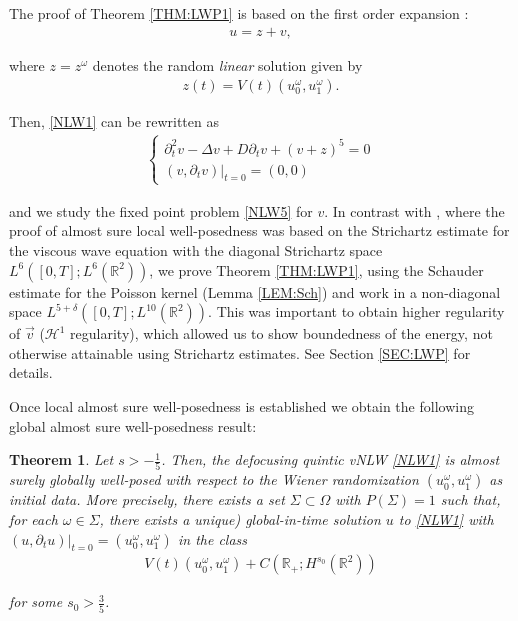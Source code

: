 \documentclass[letterpaper, 11pt,  reqno]{amsart}
\newtheorem{theorem}{Theorem} [section]
\newcommand{\1}{\hspace{0.5mm}\text{I}\hspace{0.2mm}}
\newcommand{\noi}{\noindent}
\newcommand{\R}{\mathbb{R}}
\newcommand{\dl}{\delta}
\newcommand{\Dl}{\Delta}
\newcommand{\dt}{\partial_t}
\renewcommand{\o}{\omega}
\renewcommand{\O}{\Omega}
\renewcommand{\H}{\mathcal{H}}
\numberwithin{equation}{section}
\numberwithin{theorem}{section}
\begin{document}
The proof of 
Theorem \ref{THM:LWP1} is based on 
 the first order expansion \cite{BO96, BT1, CO, BOP1, BOP2, KC}:
\begin{align}
u = z + v, 
\label{exp1}
\end{align}

\noi
where $z = z^\o$ denotes the random {\emph{linear}}  solution given by 
\begin{align}
z(t) = V(t) (u_0^\o, u_1^\o).
\label{z1}
\end{align}

\noi
Then, 
\eqref{NLW1} can be rewritten as
\begin{align}
\begin{cases}
\dt^2 v  -  \Dl  v  + D \dt v  + (v + z)^5 =0\\
(v, \dt v) |_{t = 0} = (0, 0)
\end{cases}
\label{NLW5}
\end{align}

\noi
and we study the fixed point problem \eqref{NLW5} for $v$.
In contrast with \cite{KC}, where the proof of almost sure local well-posedness
was based on the Strichartz estimate 
for the viscous wave equation %
with the diagonal Strichartz space $L^6([0, T]; L^6(\R^2))$,
we prove Theorem \ref{THM:LWP1}, 
using the Schauder estimate for the Poisson kernel (Lemma \ref{LEM:Sch})
and work in a non-diagonal space
$ L^{5+\dl}([0, T];  L^{10}(\R^2))$.
This was important to obtain higher regularity of $\vec{v}$ ($\H^1$ regularity), which allowed us to 
show boundedness of the energy, not otherwise attainable using Strichartz estimates. 
See Section \ref{SEC:LWP}
for details.


\medskip

Once local almost sure well-posedness is established we obtain the following
global almost sure well-posedness result:




\begin{theorem}\label{THM:GWP1}
Let $s > -\frac 15$.
Then, the defocusing quintic vNLW \eqref{NLW1}
is almost surely globally well-posed
with respect to the Wiener randomization $(u_0^\o, u_1^\o)$
as  initial data.
More precisely,
there exists a set $\Sigma \subset \O$
with $P(\Sigma) = 1$
such that,
for each $\o \in \Sigma$, there exists a \text{(}unique\textup{)} global-in-time  solution 
$u$
to \eqref{NLW1}
with $(u, \dt u) |_{t = 0} = (u_0^\o, u_1^\o)$
in the class
\begin{align*}
V(t)(u_0^\o, u_1^\o) +  C(\R_+; H^{s_0} (\R^2))
\end{align*}

\noi
for some $s_0 > \frac 35$.


\end{theorem}
\end{document}
